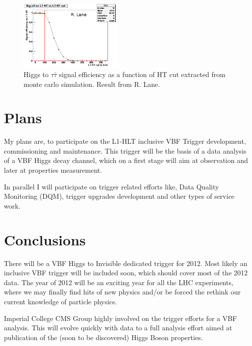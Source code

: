 \documentclass[%
 reprint,
 amsmath,
 amssymb,
 aps,
 pra,
 showkeys
]{revtex4-1}
\begin{document}
\begin{figure}[ht]
\centering
\includegraphics[width=0.45\textwidth]{img/sig_eff_l1_ht.png} 
\caption{Higgs to $\tau\bar{\tau}$ signal efficiency as a function of HT cut extracted from monte carlo simulation.
Result from R. Lane.}
\label{figure_sig_eff_l1_ht}
\end{figure}
  
\section{Plans}

My plans are, to participate on the L1-HLT inclusive VBF Trigger development, commissioning and maintenance.   
This trigger will be the basis of a data analysis of a VBF Higgs decay channel, which on a first stage will aim at 
observation and later at properties measurement.

In parallel I will participate on trigger related efforts like, Data Quality Monitoring (DQM), trigger upgrades 
development and other types of service work.

\section{Conclusions}

There will be a VBF Higgs to Invisible dedicated trigger for 2012. Most likely an inclusive VBF trigger will be 
included soon, which should cover most of the 2012 data. The year of 2012 will be an exciting year for all the LHC 
experiments, where we may finally find hits of new physics and/or be forced the rethink our current knowledge of
particle physics. 
 
Imperial College CMS Group highly involved on the trigger efforts for a VBF analysis. This will evolve quickly 
with data to a full analysis effort aimed at publication of the (soon to be discovered) Higgs Boson properties.



\end{document}
